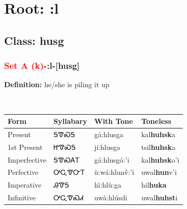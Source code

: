\needspace{4in}
\section*{Root: :l}
\nopagebreak
{}
\needspace{3in}
\subsection*{Class: husg}
\nopagebreak
\needspace{2in}
\subsubsection*{\textcolor{Red}{Set A (k)}{-}\textbf{:l}{-}[husg]}
\nopagebreak
\textbf{Definition: } he/she is piling it up
\\[0.5em]
\begin{tabularx}{\textwidth}{l X X X}%
\toprule%
\textbf{Form}&\textbf{Syllabary}&\textbf{With Tone}&\textbf{Toneless}\\%
\midrule%
Present&ᎦᏡᏍᎦ&gá:hlusga&kal\textbf{huhsk}a\\%
1st Present&ᏥᏡᏍᎦ&jí:hlusga&tsil\textbf{huhsk}a\\%
Imperfective&ᎦᏡᏍᎪᎢ&gá:hlusgó:’i&kal\textbf{huhsk}o'i\\%
Perfective&ᎤᏩᏡᏅᎢ&ù:wá:hlunv̌:’i&uwal\textbf{hun}v'i\\%
Imperative&ᎯᏡᎦ&hì:hlù:ga&hil\textbf{huka}\\%
Infinitive&ᎤᏩᏡᏍᏗ&uwà:hlúsdi&uwal\textbf{huhst}i\\%
\bottomrule%
\end{tabularx}
\\[1em]